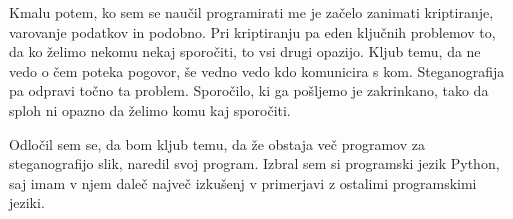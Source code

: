 Kmalu potem, ko sem se naučil programirati me je začelo zanimati kriptiranje, varovanje podatkov in podobno. Pri kriptiranju pa eden ključnih problemov to, da ko želimo nekomu nekaj sporočiti, to vsi drugi opazijo. Kljub temu, da ne vedo o čem poteka pogovor, še vedno vedo kdo komunicira s kom. Steganografija pa odpravi točno ta problem. Sporočilo, ki ga pošljemo je zakrinkano, tako da sploh ni opazno da želimo komu kaj sporočiti. \cite{wikipedia}

Odločil sem se, da bom kljub temu, da že obstaja več programov za steganografijo slik, naredil svoj program. Izbral sem si programski jezik Python, saj imam v njem daleč največ izkušenj v primerjavi z ostalimi programskimi jeziki.

